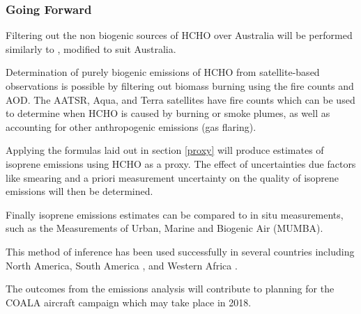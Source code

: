 \subsubsection{Going Forward}

Filtering out the non biogenic sources of HCHO over Australia will be performed similarly to \cite{Marais_2012}, modified to suit Australia.

Determination of purely biogenic emissions of HCHO from satellite-based observations is possible by filtering out biomass burning using the fire counts and AOD.
The AATSR, Aqua, and Terra satellites have fire counts which can be used to determine when HCHO is caused by burning or smoke plumes, as well as accounting for other anthropogenic emissions (gas flaring).

Applying the formulas laid out in section \ref{proxy} will produce estimates of isoprene emissions using HCHO as a proxy.
The effect of uncertainties due factors like smearing and a priori measurement uncertainty on the quality of isoprene emissions will then be determined.

Finally isoprene emissions estimates can be compared to in situ measurements, such as the Measurements of Urban, Marine and Biogenic Air (MUMBA).

This method of inference has been used successfully in several countries including North America\cite{Palmer_2003}, South America \cite{Barkley_2013}, and Western Africa \cite{Marais_2012}.

The outcomes from the emissions analysis will contribute to planning for the COALA aircraft campaign which may take place in 2018.
